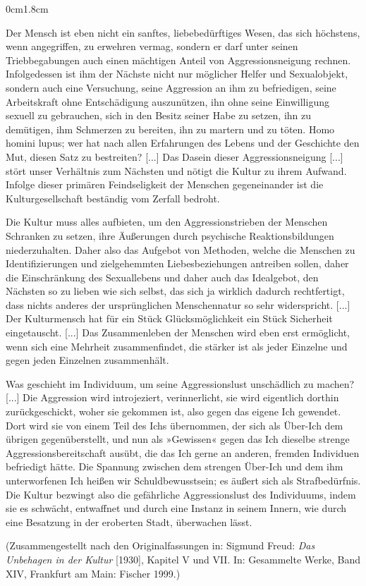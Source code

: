 \documentclass[a4paper, 11pt, parskip=half]{scrartcl}
\begin{document}
\begin{adjustwidth}{0cm}{1.8cm}
\small
\begin{linenumbers}
Der Mensch ist eben nicht ein sanftes, liebebedürftiges Wesen, das sich höchstens, wenn 
angegriffen, zu erwehren vermag, sondern er darf unter seinen Triebbegabungen auch einen 
mächtigen Anteil von Aggressionsneigung rechnen. Infolgedessen ist ihm der Nächste nicht nur 
möglicher Helfer und Sexualobjekt, sondern auch eine Versuchung, seine Aggression an ihm zu 
befriedigen, seine Arbeitskraft ohne Entschädigung auszunützen, ihn ohne seine Einwilligung 
sexuell zu gebrauchen, sich in den Besitz seiner Habe zu setzen, ihn zu demütigen, ihm 
Schmerzen zu bereiten, ihn zu martern und zu töten. Homo homini lupus; wer hat nach allen 
Erfahrungen des Lebens und der Geschichte den Mut, diesen Satz zu bestreiten? [...] Das 
Dasein dieser Aggressionsneigung [...] stört unser Verhältnis zum Nächsten und nötigt die 
Kultur zu ihrem Aufwand. Infolge dieser primären Feindseligkeit der Menschen gegeneinander 
ist die Kulturgesellschaft beständig vom Zerfall bedroht.

Die Kultur muss alles aufbieten, um den Aggressionstrieben der Menschen Schranken zu 
setzen, ihre Äußerungen durch psychische Reaktionsbildungen niederzuhalten. Daher also das 
Aufgebot von Methoden, welche die Menschen zu Identifizierungen und zielgehemmten 
Liebesbeziehungen antreiben sollen, daher die Einschränkung des Sexuallebens und daher 
auch das Idealgebot, den Nächsten so zu lieben wie sich selbst, das sich ja wirklich 
dadurch rechtfertigt, dass nichts anderes der ursprünglichen Menschennatur so sehr 
widerspricht. [...] Der Kulturmensch hat für ein Stück Glücksmöglichkeit ein Stück 
Sicherheit eingetauscht. [...] Das Zusammenleben der Menschen wird eben erst ermöglicht, 
wenn sich eine Mehrheit zusammenfindet, die stärker ist als jeder Einzelne und gegen 
jeden Einzelnen zusammenhält.

Was geschieht im Individuum, um seine Aggressionslust unschädlich zu machen? [...] Die 
Aggression wird introjeziert, verinnerlicht, sie wird eigentlich dorthin zurückgeschickt, 
woher sie gekommen ist, also gegen das eigene Ich gewendet. Dort wird sie von einem 
Teil des Ichs übernommen, der sich als Über-Ich dem übrigen gegenüberstellt, und nun als 
»Gewissen« gegen das Ich dieselbe strenge Aggressionsbereitschaft ausübt, die das Ich 
gerne an anderen, fremden Individuen befriedigt hätte. Die Spannung zwischen dem 
strengen Über-Ich und dem ihm unterworfenen Ich heißen wir Schuldbewusstsein; es 
äußert sich als Strafbedürfnis. Die Kultur bezwingt also die gefährliche Aggressionslust 
des Individuums, indem sie es schwächt, entwaffnet und durch eine Instanz in seinem 
Innern, wie durch eine Besatzung in der eroberten Stadt, überwachen lässt.
\end{linenumbers}
\vspace{0.15cm}
\tiny {
(Zusammengestellt nach den Originalfassungen in: Sigmund Freud: \textit{Das Unbehagen in der Kultur} [1930], Kapitel V und VII. In: Gesammelte Werke, Band XIV, Frankfurt am Main: Fischer 1999.)}
\end{adjustwidth}
\end{document}
